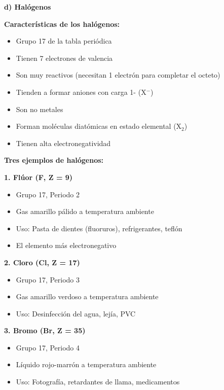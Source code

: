 \begin{exercise}
\begin{solu}
        \textbf{d) Halógenos}

        \textbf{Características de los halógenos:}
        \begin{itemize}
            \item Grupo 17 de la tabla periódica
            \item Tienen 7 electrones de valencia
            \item Son muy reactivos (necesitan 1 electrón para completar el octeto)
            \item Tienden a formar aniones con carga 1- (X\(^-\))
            \item Son no metales
            \item Forman moléculas diatómicas en estado elemental (X\(_2\))
            \item Tienen alta electronegatividad
        \end{itemize}

        \textbf{Tres ejemplos de halógenos:}

        \textbf{1. Flúor (F, Z = 9)}
        \begin{itemize}
            \item Grupo 17, Periodo 2
            \item Gas amarillo pálido a temperatura ambiente
            \item Uso: Pasta de dientes (fluoruros), refrigerantes, teflón
            \item El elemento más electronegativo
        \end{itemize}

        \textbf{2. Cloro (Cl, Z = 17)}
        \begin{itemize}
            \item Grupo 17, Periodo 3
            \item Gas amarillo verdoso a temperatura ambiente
            \item Uso: Desinfección del agua, lejía, PVC
        \end{itemize}

        \textbf{3. Bromo (Br, Z = 35)}
        \begin{itemize}
            \item Grupo 17, Periodo 4
            \item Líquido rojo-marrón a temperatura ambiente
            \item Uso: Fotografía, retardantes de llama, medicamentos
        \end{itemize}


\end{solu}
\end{exercise}
